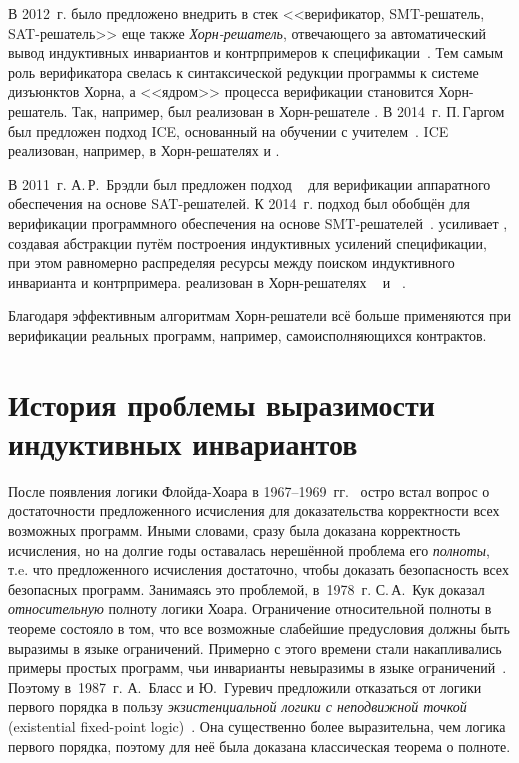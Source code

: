В 2012~г. было предложено внедрить в стек <<верификатор, SMT-решатель, SAT-решатель>> еще также \emph{Хорн-решатель},  отвечающего за автоматический вывод индуктивных инвариантов и контрпримеров к спецификации~\cite{10.1145/2254064.2254112}.
Тем самым роль верификатора свелась к синтаксической редукции программы к системе дизъюнктов Хорна, а <<ядром>> процесса верификации становится Хорн-решатель.
Так, например, \cegar{} был реализован в Хорн-решателе \eldarica{}.
В 2014~г. П.\,Гаргом был предложен подход ICE, основанный на обучении с учителем~\cite{10.1007/978-3-319-08867-9_5}.
ICE реализован, например, в Хорн-решателях \hoice{} и \rchc{}.

В 2011~г. А.\,Р.~Брэдли был предложен подход \pdr{}~\cite{10.1007/978-3-642-18275-4_7} для верификации аппаратного обеспечения на основе SAT-решателей.
К 2014~г. подход был обобщён для верификации программного обеспечения на основе SMT-решателей~\cite{10.1007/978-3-642-54862-8_4,10.1007/978-3-642-31612-8_13}.
\pdr{} усиливает \cegar{}, создавая абстракции путём построения индуктивных усилений спецификации, при этом равномерно распределяя ресурсы между поиском индуктивного инварианта и контрпримера.
\pdr{} реализован в Хорн-решателях \spacer{}~\cite{komuravelli2016smt} и \racer{}~\cite{10.1145/3498722}.

Благодаря эффективным алгоритмам Хорн-решатели всё больше применяются при верификации реальных программ, например, самоисполняющихся контрактов.

\section{История проблемы выразимости индуктивных инвариантов}\label{sec:background/historyExpressivity}
После появления логики Флойда-Хоара в \numrange{1967}{1969}~гг.~\cite{Floyd1993,10.1145/363235.363259} остро встал вопрос о достаточности предложенного исчисления для доказательства корректности всех возможных программ.
Иными словами, сразу была доказана корректность исчисления, но на долгие годы оставалась нерешённой проблема его \emph{полноты}, т.\:e. что предложенного исчисления достаточно, чтобы доказать безопасность всех безопасных программ.
Занимаясь это проблемой, в~1978~г. С.\,А.~Кук доказал~\cite{doi:10.1137/0207005} \emph{относительную} полноту логики Хоара.
Ограничение относительной полноты в теореме состояло в том, что все возможные слабейшие предусловия должны быть выразимы в языке ограничений.
Примерно с этого времени стали накапливались примеры простых программ, чьи инварианты невыразимы в языке ограничений~\cite{10.1145/371282.371285}.
Поэтому в~1987~г. А.~Бласс и Ю.~Гуревич предложили отказаться от логики первого порядка в пользу \emph{экзистенциальной логики с неподвижной точкой} (existential fixed-point logic)~\cite{Blass1987,blass2000the}. Она существенно более выразительна, чем логика первого порядка, поэтому для неё была доказана классическая теорема о полноте.


